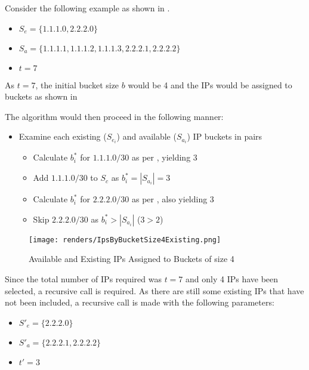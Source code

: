 Consider the following example as shown in .
\begin{itemize}
\item{$S_e = \{1.1.1.0, 2.2.2.0\}$}
\item{$S_a = \{1.1.1.1, 1.1.1.2, 1.1.1.3, 2.2.2.1, 2.2.2.2\}$}
\item{$t = 7$}
\end{itemize}

As $t = 7$, the initial bucket size $b$ would be 4 and the IPs would be assigned to buckets as shown in 

The algorithm would then proceed in the following manner:
\begin{itemize}
\item{Examine each existing ($S_{e_i}$) and available ($S_{a_i}$) IP buckets in pairs}
\begin{itemize}
\item{Calculate $b_i^*$ for $1.1.1.0/30$ as per , yielding 3}
\item{Add $1.1.1.0/30$ to $S_c$ as $b^*_i = |S_{a_i}| = 3$}
\end{itemize}
\begin{itemize}
\item{Calculate $b_i^*$ for $2.2.2.0/30$ as per , also yielding 3}
\item{Skip $2.2.2.0/30$ as $b^*_i > |S_{a_i}|$ ($3 > 2$)}    
\end{itemize}
\end{itemize}

\begin{figure}[H]
      \centering
      \texttt{[image: renders/IpsByBucketSize4Existing.png]}
      \caption{Available and Existing IPs Assigned to Buckets of size 4}
      \label{fig:ipsByBucketExisting4}
\end{figure}

Since the total number of IPs required was $t = 7$ and only 4 IPs have been selected, a recursive call is required. As there are still some existing IPs that have not been included, a recursive call is made with the following parameters:
\begin{itemize}
\item{$S'_e = \{2.2.2.0\}$}
\item{$S'_a = \{2.2.2.1, 2.2.2.2\}$}
\item{$t' = 3$}
\end{itemize}

